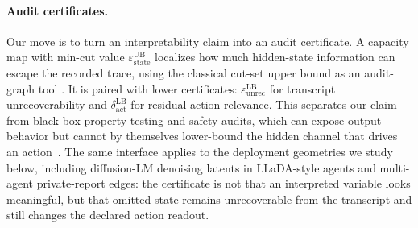   \paragraph{Audit certificates.}
  Our move is to turn an interpretability claim into an audit certificate. A
  capacity map with min-cut value $\varepsilon_\text{state}^\text{UB}$ localizes
  how much hidden-state information can escape the recorded trace, using the
  classical cut-set upper bound as an audit-graph tool
  \citep{elgamal2011network}. It is paired with lower certificates:
  $\varepsilon_\mathrm{unrec}^\mathrm{LB}$ for transcript unrecoverability and
  $\delta_\mathrm{act}^\mathrm{LB}$ for residual action relevance. This separates
  our claim from black-box property testing and safety audits, which can expose
  output behavior but cannot by themselves lower-bound the hidden channel that
  drives an action~\citep{goldreich1998property,casper2024blackbox,su2024mission}.
  The same interface applies to the deployment geometries we study below,
  including diffusion-LM denoising latents in LLaDA-style agents
  \citep{nie2025llada,zhen2026dllmagent} and multi-agent private-report edges:
  the certificate is not that an interpreted variable looks meaningful, but that
  omitted state remains unrecoverable from the transcript and still changes the
  declared action readout.

